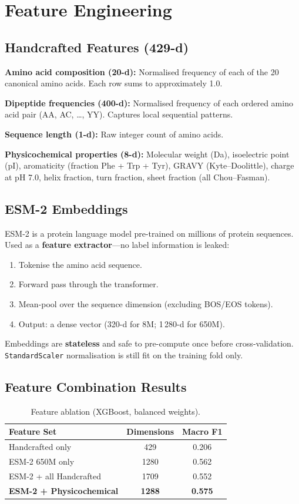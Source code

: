 \documentclass[11pt,a4paper]{article}
\begin{document}
\section{Feature Engineering}
\subsection{Handcrafted Features (429-d)}
\textbf{Amino acid composition (20-d):} Normalised frequency of each of the 20 canonical amino
acids. Each row sums to approximately 1.0.

\textbf{Dipeptide frequencies (400-d):} Normalised frequency of each ordered amino acid pair
(AA, AC, \ldots, YY). Captures local sequential patterns.

\textbf{Sequence length (1-d):} Raw integer count of amino acids.

\textbf{Physicochemical properties (8-d):} Molecular weight (Da), isoelectric point (pI),
aromaticity (fraction Phe + Trp + Tyr), GRAVY (Kyte--Doolittle), charge at pH 7.0,
helix fraction, turn fraction, sheet fraction (all Chou--Fasman).

\subsection{ESM-2 Embeddings}
ESM-2 is a protein language model pre-trained on millions of protein sequences.
Used as a \textbf{feature extractor}---no label information is leaked:
\begin{enumerate}
\item Tokenise the amino acid sequence.
\item Forward pass through the transformer.
\item Mean-pool over the sequence dimension (excluding BOS/EOS tokens).
\item Output: a dense vector (320-d for 8M; 1\,280-d for 650M).
\end{enumerate}

Embeddings are \textbf{stateless} and safe to pre-compute once before cross-validation.
\texttt{StandardScaler} normalisation is still fit on the training fold only.

\subsection{Feature Combination Results}

\begin{table}[H]
\centering
\caption{Feature ablation (XGBoost, balanced weights).}
\begin{tabular}{lcc}
\toprule
Feature Set & Dimensions & Macro F1 \\
\midrule
Handcrafted only & 429 & 0.206 \\
ESM-2 650M only & 1280 & 0.562 \\
ESM-2 + all Handcrafted & 1709 & 0.552 \\
\textbf{ESM-2 + Physicochemical} & \textbf{1288} & \textbf{0.575} \\
\bottomrule
\end{tabular}
\end{table}
\end{document}
